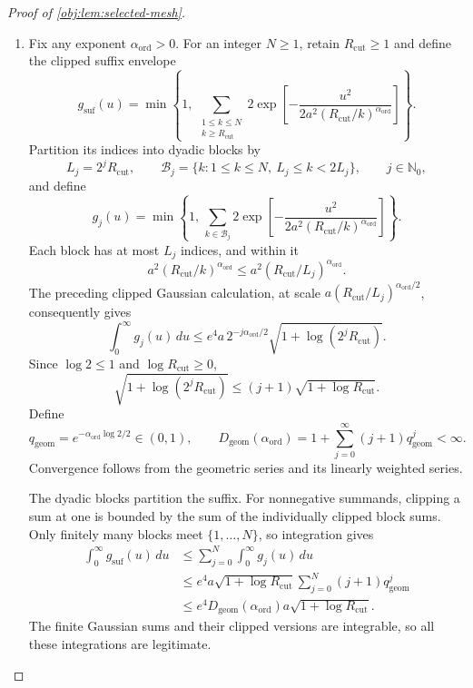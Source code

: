 \begin{proof}[Proof of \cref{obj:lem:selected-mesh}]
\begin{enumerate}
\item Fix any exponent \(\alpha_{\mathrm{ord}}>0\). For an integer
\(N\ge1\), retain \(R_{\mathrm{cut}}\ge1\) and define the clipped suffix
envelope
\[
g_{\mathrm{suf}}(u)
=
\min\!\left\{1,\,
\sum_{\substack{1\le k\le N\\k\ge R_{\mathrm{cut}}}}
2\exp\!\left[
-\frac{u^2}{
2a^2(R_{\mathrm{cut}}/k)^{\alpha_{\mathrm{ord}}}}
\right]\right\}.
\]
Partition its indices into dyadic blocks by
\[
L_j=2^jR_{\mathrm{cut}},\qquad
\mathcal B_j
=
\{k:1\le k\le N,\ L_j\le k<2L_j\},
\qquad j\in\mathbb N_0,
\]
and define
\[
g_j(u)
=
\min\!\left\{1,\,
\sum_{k\in\mathcal B_j}
2\exp\!\left[
-\frac{u^2}{
2a^2(R_{\mathrm{cut}}/k)^{\alpha_{\mathrm{ord}}}}
\right]\right\}.
\]
Each block has at most \(L_j\) indices, and within it
\[
a^2(R_{\mathrm{cut}}/k)^{\alpha_{\mathrm{ord}}}
\le a^2(R_{\mathrm{cut}}/L_j)^{\alpha_{\mathrm{ord}}}.
\]
The preceding clipped Gaussian calculation, at scale
\(a(R_{\mathrm{cut}}/L_j)^{\alpha_{\mathrm{ord}}/2}\), consequently gives
\[
\int_0^\infty g_j(u)\,du
\le
e^4a\,2^{-j\alpha_{\mathrm{ord}}/2}
\sqrt{1+\log(2^jR_{\mathrm{cut}})}.
\]
Since \(\log2\le1\) and \(\log R_{\mathrm{cut}}\ge0\),
\[
\sqrt{1+\log(2^jR_{\mathrm{cut}})}
\le(j+1)\sqrt{1+\log R_{\mathrm{cut}}}.
\]
Define
\[
q_{\mathrm{geom}}
=
e^{-\alpha_{\mathrm{ord}}\log2/2}\in(0,1),
\qquad
D_{\mathrm{geom}}(\alpha_{\mathrm{ord}})
=
1+\sum_{j=0}^{\infty}(j+1)q_{\mathrm{geom}}^j<\infty.
\]
Convergence follows from the geometric series and its linearly weighted
series.

The dyadic blocks partition the suffix. For nonnegative summands,
clipping a sum at one is bounded by the sum of the individually clipped
block sums. Only finitely many blocks meet \(\{1,\ldots,N\}\), so
integration gives
\[
\begin{aligned}
\int_0^\infty g_{\mathrm{suf}}(u)\,du
&\le\sum_{j=0}^{N}\int_0^\infty g_j(u)\,du\\
&\le
e^4a\sqrt{1+\log R_{\mathrm{cut}}}
\sum_{j=0}^{N}(j+1)q_{\mathrm{geom}}^j\\
&\le
e^4D_{\mathrm{geom}}(\alpha_{\mathrm{ord}})
a\sqrt{1+\log R_{\mathrm{cut}}}.
\end{aligned}
\]
The finite Gaussian sums and their clipped versions are integrable, so
all these integrations are legitimate.


\end{enumerate}
\end{proof}
